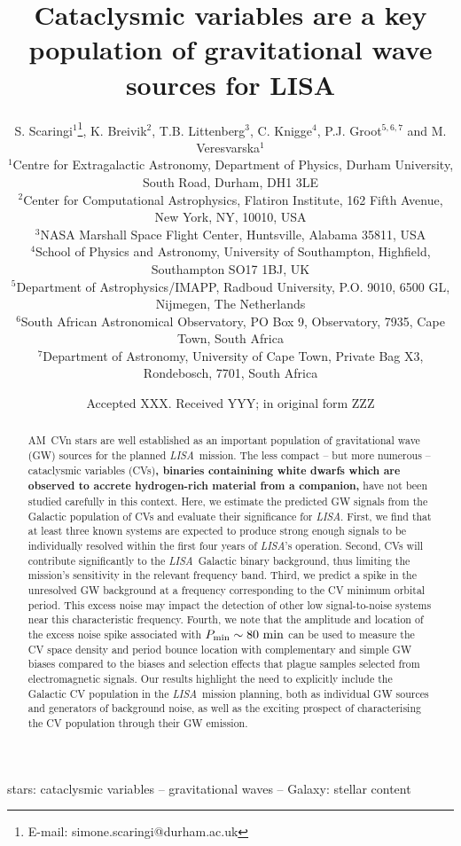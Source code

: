 \documentclass[fleqn,usenatbib]{mnras}
\title[LISA CVs]{Cataclysmic variables are a key population of gravitational wave sources for LISA}
\author[S. Scaringi et al.]{
S. Scaringi$^{1}$\thanks{E-mail: simone.scaringi@durham.ac.uk},
K. Breivik$^{2}$,
T.B. Littenberg$^{3}$,
C. Knigge$^{4}$,
P.J. Groot$^{5,6,7}$ and
M. Veresvarska$^{1}$
\\
$^{1}$Centre for Extragalactic Astronomy, Department of Physics, Durham University, South Road, Durham, DH1 3LE\\
$^{2}$Center for Computational Astrophysics, Flatiron Institute, 162 Fifth Avenue, New York, NY, 10010, USA\\
$^{3}$NASA Marshall Space Flight Center, Huntsville, Alabama 35811, USA\\
$^{4}$School of Physics and Astronomy, University of Southampton, Highfield, Southampton SO17 1BJ, UK\\
$^{5}$Department of Astrophysics/IMAPP, Radboud University, P.O. 9010, 6500 GL, Nijmegen, The Netherlands\\
$^{6}$South African Astronomical Observatory, PO Box 9, Observatory, 7935, Cape Town, South Africa\\
$^{7}$Department of Astronomy, University of Cape Town, Private Bag X3, Rondebosch, 7701, South Africa\\
}
\date{Accepted XXX. Received YYY; in original form ZZZ}
\newcommand{\lisa}{{\it LISA}}
\begin{document}
\maketitle

\begin{abstract}
AM~CVn stars are well established as an important population of gravitational wave (GW) sources for the planned \lisa\ mission. The less compact – but more numerous – cataclysmic variables (CVs)\textbf{, binaries containining white dwarfs which are observed to accrete hydrogen-rich material from a companion,} have not been studied carefully in this context. Here, we estimate the predicted GW signals from the Galactic population of CVs and evaluate their significance for \lisa. First, we find that at least three known systems are expected to produce strong enough signals to be individually resolved within the first four years of \lisa's operation. Second, CVs will contribute significantly to the \lisa\ Galactic binary background, thus limiting the mission's sensitivity in the relevant frequency band. Third, we predict a spike in the unresolved GW background at a frequency corresponding to the CV minimum orbital period. This excess noise may impact the detection of other low signal-to-noise systems near this characteristic frequency. Fourth, we note that the amplitude and location of the excess noise spike associated with \textbf{$P_{\rm{min}}\sim80~\mathrm{min}$} can be used to measure the CV space density and period bounce location with complementary and simple GW biases compared to the biases and selection effects that plague samples selected from electromagnetic signals. Our results highlight the need to explicitly include the Galactic CV population in the \lisa\ mission planning, both as individual GW sources and generators of background noise, as well as the exciting prospect of characterising the CV population through their GW emission.
\end{abstract}
    
    
\begin{keywords}
    stars: cataclysmic variables -- gravitational waves -- Galaxy: stellar content 
\end{keywords}

\end{document}
